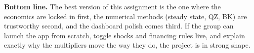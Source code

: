 \documentclass[11pt]{article}
\begin{document}
\begin{goalbox}
\textbf{Bottom line.} The best version of this assignment is the one where the economics are locked in first, the numerical methods (steady state, QZ, BK) are trustworthy second, and the dashboard polish comes third. If the group can launch the app from scratch, toggle shocks and financing rules live, and explain exactly why the multipliers move the way they do, the project is in strong shape.
\end{goalbox}
\end{document}
